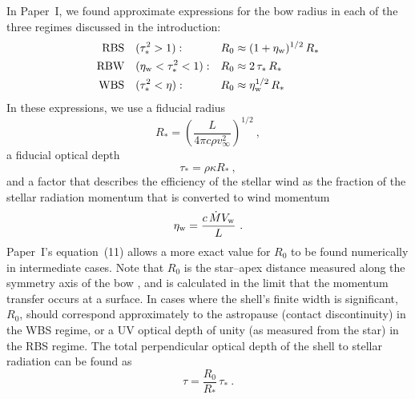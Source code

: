 \documentclass[useAMS, usenatbib, a4paper]{mnras}
\begin{document}
In Paper~I, we found approximate expressions for the bow radius in each of the three regimes discussed in the introduction: 
\begin{equation}
\begin{aligned}
  \text{RBS} \quad& (\tau_*^2 > 1): & R_0 &\approx  (1 + \eta_{\text{w}})^{1/2} \, R_*  \\
  \text{RBW} \quad& (\eta_{\text{w}} < \tau_*^2 < 1): & R_0 &\approx 2 \, \tau_* \, R_* \\
  \text{WBS} \quad& (\tau_*^2 < \eta): & R_0 &\approx \eta_{\text{w}}^{1/2} \, R_*  
\end{aligned}\label{eq:x-cases}
\end{equation}
In these expressions, we use a fiducial radius
\begin{equation}
  \label{eq:Rstar}
  R_* = \left(\frac{L}{4\pi c \rho v_\infty^2}\right)^{1/2} \ ,
\end{equation}
a fiducial optical depth
\begin{equation}
  \label{eq:tau-star}
  \tau_* = \rho \kappa R_* \ ,
\end{equation}
and a factor that describes the efficiency of the stellar wind as the fraction of the stellar radiation momentum that is converted to wind momentum
\begin{equation}
  \label{eq:wind-efficiency}
  \eta_{\text{w}}  = \frac{c\, \dot{M} V_{\text{w}}}{L} \ .
\end{equation}
Paper~I's equation~(11) allows a more exact value for \(R_0\) to be
found numerically in intermediate cases.  Note that \(R_0\) is the
star--apex distance measured along the symmetry axis of the bow
\citetext{see \citealp{Tarango-Yong:2018a} for explanation of
  nomenclature and discussion of bow shapes}, and is calculated in the
limit that the momentum transfer occurs at a surface.  In cases where
the shell's finite width is significant, \(R_0\), should correspond
approximately to the astropause (contact discontinuity) in the WBS
regime, or a UV optical depth of unity (as measured from the star) in
the RBS regime.  The total perpendicular optical depth of the shell to
stellar radiation can be found as
\begin{equation}
  \label{eq:actual-tau}
  \tau = \frac{R_0}{R_*} \, \tau_* \ .
\end{equation}
\end{document}
